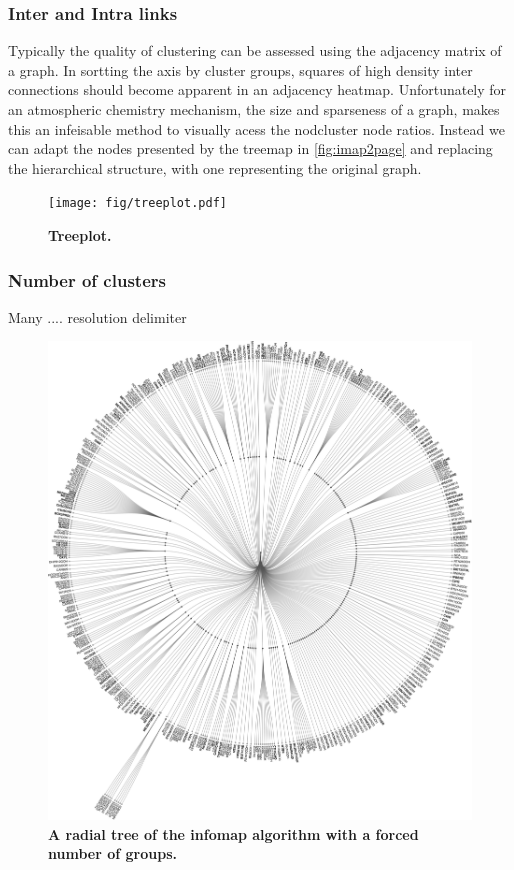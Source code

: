 
\subsubsection{Inter and Intra links}
 Typically the quality of clustering can be assessed using the adjacency matrix of a graph. In sortting the axis by cluster groups, squares of high density inter connections should become apparent in an adjacency heatmap. Unfortunately for an atmospheric chemistry mechanism, the size and sparseness of a graph, makes this an infeisable method to visually acess the nodcluster node ratios. Instead we can adapt the nodes presented by the treemap in \autoref{fig:imap2page} and replacing the hierarchical structure, with one representing the original graph. 

 
   \begin{figure}[H]
     \centering
     \texttt{[image: fig/treeplot.pdf]}
     \caption{\textbf{Treeplot.} }
         \label{fig:imtreeplot}
   \end{figure}



 

 \subsubsection{Number of clusters}
 Many .... 
  resolution delimiter


  \begin{figure}[H]
    \centering
    \includegraphics[width=\textwidth]{fig/manygroups.pdf}
    \caption{\textbf{A radial tree of the infomap algorithm with a forced number of groups.} }
        \label{fig:im200}
  \end{figure}




















%

